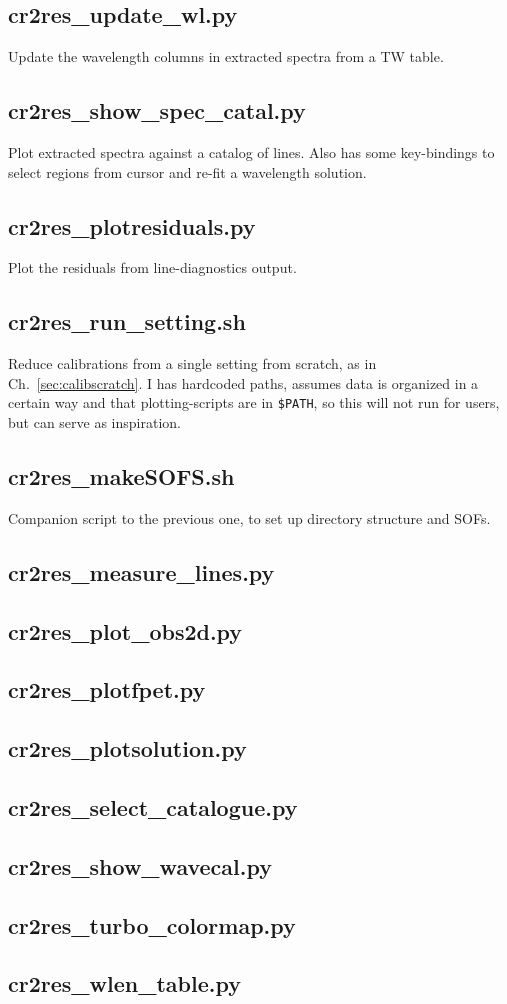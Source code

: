 \subsection{cr2res\_update\_wl.py}
Update the wavelength columns in extracted spectra from a TW table.

\subsection{cr2res\_show\_spec\_catal.py}
Plot extracted spectra against a catalog of lines. Also has some key-bindings
to select regions from cursor and re-fit a wavelength solution.

\subsection{cr2res\_plotresiduals.py}
Plot the residuals from line-diagnostics output.

\subsection{cr2res\_run\_setting.sh}
Reduce calibrations from a single setting from scratch, as in
Ch.~\ref{sec:calibscratch}. I has hardcoded paths, assumes data is organized in
a certain way and that plotting-scripts are in \verb!$PATH!, so this will not
run for users, but can serve as inspiration.

\subsection{cr2res\_makeSOFS.sh}
Companion script to the previous one, to set up directory structure and SOFs.

\subsection{cr2res\_measure\_lines.py}
\subsection{cr2res\_plot\_obs2d.py}
\subsection{cr2res\_plotfpet.py}
\subsection{cr2res\_plotsolution.py}
\subsection{cr2res\_select\_catalogue.py}
\subsection{cr2res\_show\_wavecal.py}
\subsection{cr2res\_turbo\_colormap.py}
\subsection{cr2res\_wlen\_table.py}
